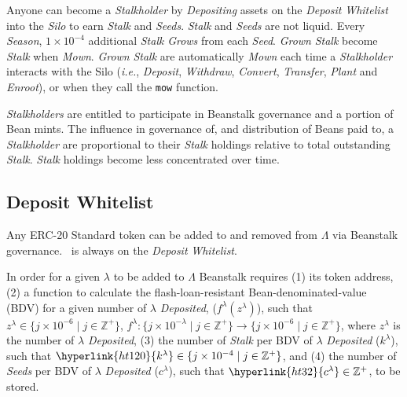 \documentclass[tikz]{article}
\newcommand{\code}[1]{\texttt{#1}}
\newcommand{\term}[1]{\textsl{#1}}
\newcommand{\Bean}{} %
\begin{document}
Anyone can become a \term{Stalkholder} by \term{Depositing} assets on the \term{Deposit} \term{Whitelist} into the \term{Silo} to earn \term{Stalk} and \term{Seeds}. \term{Stalk} and \term{Seeds} are not liquid. Every \term{Season}, $1 \times 10^{-4}$ additional \term{Stalk} \term{Grows} from each \term{Seed}. \term{Grown} \term{Stalk} become \term{Stalk} when \term{Mown}. \term{Grown} \term{Stalk} are automatically \term{Mown} each time a \term{Stalkholder} interacts with the Silo (\term{i.e.}, \term{Deposit}, \term{Withdraw}, \term{Convert}, \term{Transfer}, \term{Plant} and \term{Enroot}), or when they call the \code{mow} function.

\term{Stalkholders} are entitled to participate in Beanstalk governance and a portion of Bean mints. The influence in governance of, and distribution of Beans paid to, a \term{Stalkholder} are proportional to their \term{Stalk} holdings relative to total outstanding \term{Stalk}. \term{Stalk} holdings become less concentrated over time.

\vspace*{-1mm}
\subsection{Deposit Whitelist}
\vspace*{-1mm}
Any ERC-20 Standard token can be added to and removed from \hyperlink{ht127}{$\Lambda$} via Beanstalk governance. \Bean\ is always on the \term{Deposit} \term{Whitelist}.

In order for a given \hyperlink{ht126}{$\lambda$} to be added to \hyperlink{ht127}{$\Lambda$} Beanstalk requires (1) its token address, (2) a function to calculate the flash-loan-resistant Bean-denominated-value (BDV) for a given number of \hyperlink{ht126}{$\lambda$} \term{Deposited}, (\hyperlink{ht84}{$f^{\lambda}(z^{\lambda})$}), such that $z^{\lambda} \in \{j \times 10^{-6} \mid j \in \mathbb{Z}^{+} \}$, $f^{\lambda}\colon \{j \times 10^{-\lambda} \mid j \in \mathbb{Z}^{+} \} \rightarrow \{j \times 10^{-6} \mid j \in \mathbb{Z}^{+} \}$, where $z^{\lambda}$ is the number of \hyperlink{ht126}{$\lambda$} \term{Deposited}, (3) the number of \term{Stalk} per BDV of \hyperlink{ht126}{$\lambda$} \term{Deposited} (\hyperlink{ht120}{$k^{\lambda}$}), such that $\hyperlink{ht120}{k^{\lambda}} \in \{j \times 10^{-4} \mid j \in \mathbb{Z}^{+} \}$, and (4) the number of \term{Seeds} per BDV of \hyperlink{ht126}{$\lambda$} \term{Deposited} (\hyperlink{ht32}{$c^{\lambda}$}), such that $\hyperlink{ht32}{c^{\lambda}} \in \mathbb{Z}^{+}$, to be stored.
\end{document}
